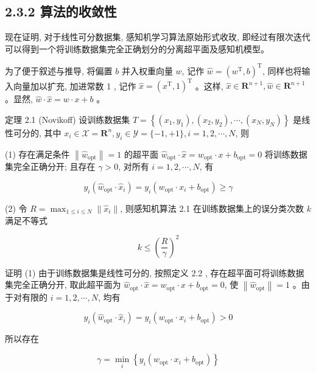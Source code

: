 \documentclass[10pt]{article}
\begin{document}
\subsection*{2.3.2 算法的收敛性}
现在证明, 对于线性可分数据集, 感知机学习算法原始形式收玫, 即经过有限次迭代可以得到一个将训练数据集完全正确划分的分离超平面及感知机模型。

为了便于叙述与推导, 将偏置 $b$ 并入权重向量 $w$, 记作 $\hat{w}=\left(w^{\mathrm{T}}, b\right)^{\mathrm{T}}$, 同样也将输入向量加以扩充, 加进常数 1 , 记作 $\hat{x}=\left(x^{\mathrm{T}}, 1\right)^{\mathrm{T}}$ 。这样, $\hat{x} \in \boldsymbol{R}^{n+1}, \hat{w} \in \boldsymbol{R}^{n+1}$ 。显然, $\hat{w} \cdot \hat{x}=w \cdot x+b$ 。

定理 2.1 (Novikoff) 设训练数据集 $T=\left\{\left(x_{1}, y_{1}\right),\left(x_{2}, y_{2}\right), \cdots,\left(x_{N}, y_{N}\right)\right\}$ 是线性可分的, 其中 $x_{i} \in \mathcal{X}=\boldsymbol{R}^{n}, y_{i} \in \mathcal{Y}=\{-1,+1\}, i=1,2, \cdots, N$, 则

(1) 存在满足条件 $\left\|\hat{w}_{\mathrm{opt}}\right\|=1$ 的超平面 $\hat{w}_{\mathrm{opt}} \cdot \hat{x}=w_{\mathrm{opt}} \cdot x+b_{\mathrm{opt}}=0$ 将训练数据集完全正确分开; 且存在 $\gamma>0$, 对所有 $i=1,2, \cdots, N$, 有


\begin{equation*}
y_{i}\left(\hat{w}_{\mathrm{opt}} \cdot \hat{x}_{i}\right)=y_{i}\left(w_{\mathrm{opt}} \cdot x_{i}+b_{\mathrm{opt}}\right) \geqslant \gamma \tag{2.8}
\end{equation*}


(2) 令 $R=\max _{1 \leqslant i \leqslant N}\left\|\hat{x}_{i}\right\|$, 则感知机算法 2.1 在训练数据集上的误分类次数 $k$ 满足不等式


\begin{equation*}
k \leqslant\left(\frac{R}{\gamma}\right)^{2} \tag{2.9}
\end{equation*}


证明 (1) 由于训练数据集是线性可分的, 按照定义 2.2 , 存在超平面可将训练数据集完全正确分开, 取此超平面为 $\hat{w}_{\mathrm{opt}} \cdot \hat{x}=w_{\mathrm{opt}} \cdot x+b_{\mathrm{opt}}=0$, 使 $\left\|\hat{w}_{\mathrm{opt}}\right\|=1$ 。由于对有限的 $i=1,2, \cdots, N$, 均有

$$
y_{i}\left(\hat{w}_{\mathrm{opt}} \cdot \hat{x}_{i}\right)=y_{i}\left(w_{\mathrm{opt}} \cdot x_{i}+b_{\mathrm{opt}}\right)>0
$$

所以存在

$$
\gamma=\min _{i}\left\{y_{i}\left(w_{\mathrm{opt}} \cdot x_{i}+b_{\mathrm{opt}}\right)\right\}
$$
\end{document}
